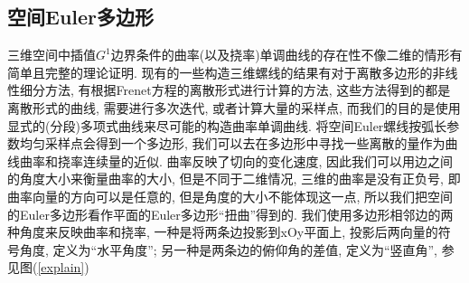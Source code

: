 \documentclass[utf8]{ctexart} %
\numberwithin{figure}{section}
\numberwithin{equation}{section}
\begin{document}
	 \subsection{空间Euler多边形}
	 三维空间中插值$G^1$边界条件的曲率(以及挠率)单调曲线的存在性不像二维的情形有简单且完整的理论证明. 现有的一些构造三维螺线的结果有对于离散多边形的非线性细分方法, 有根据Frenet方程的离散形式进行计算的方法, 这些方法得到的都是离散形式的曲线, 需要进行多次迭代, 或者计算大量的采样点, 而我们的目的是使用显式的(分段)多项式曲线来尽可能的构造曲率单调曲线. 将空间Euler螺线按弧长参数均匀采样点会得到一个多边形, 我们可以去在多边形中寻找一些离散的量作为曲线曲率和挠率连续量的近似. 曲率反映了切向的变化速度, 因此我们可以用边之间的角度大小来衡量曲率的大小, 但是不同于二维情况, 三维的曲率是没有正负号, 即曲率向量的方向可以是任意的, 但是角度的大小不能体现这一点, 所以我们把空间的Euler多边形看作平面的Euler多边形“扭曲”得到的. 我们使用多边形相邻边的两种角度来反映曲率和挠率, 一种是将两条边投影到xOy平面上, 投影后两向量的符号角度, 定义为“水平角度”; 另一种是两条边的俯仰角的差值, 定义为“竖直角”, 参见图(\ref{explain})\par 
\end{document}
